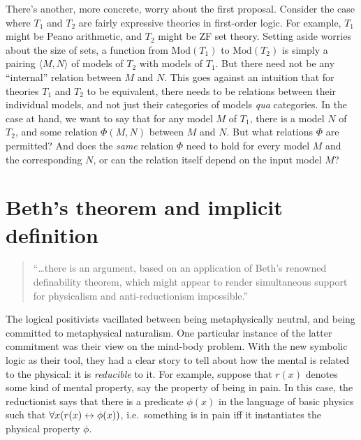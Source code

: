 \begin{example}
There's another, more concrete, worry about the first proposal.
Consider the case where $T_1$ and $T_2$ are fairly expressive theories
in first-order logic.  For example, $T_1$ might be Peano arithmetic,
and $T_2$ might be ZF set theory.  Setting aside worries about the
size of sets, a function from $\mathrm{Mod}(T_1)$ to
$\mathrm{Mod}(T_2)$ is simply a pairing $\langle M,N\rangle$ of models
of $T_2$ with models of $T_1$.  But there need not be any ``internal''
relation between $M$ and $N$.  This goes against an intuition that for
theories $T_1$ and $T_2$ to be equivalent, there needs to be relations
between their individual models, and not just their categories of
models {\it qua} categories.  In the case at hand, we want to say that
for any model $M$ of $T_1$, there is a model $N$ of $T_2$, and some
relation $\Phi (M,N)$ between $M$ and $N$.  But what relations $\Phi$
are permitted?  And does the {\it same} relation $\Phi$ need to hold
for every model $M$ and the corresponding $N$, or can the relation
itself depend on the input model $M$?

\end{example}




\section{Beth's theorem and implicit definition} \label{go-beth}

\begin{quote} ``\dots there is an argument, based on an application of
  Beth's renowned definability theorem, which might appear to render
  simultaneous support for physicalism and anti-reductionism
  impossible.''  \citep{hellman} \end{quote}

\bigskip \noindent The logical positivists vacillated between being
metaphysically neutral, and being committed to metaphysical
naturalism.  One particular instance of the latter commitment was
their view on the mind-body problem.  With the new symbolic logic as
their tool, they had a clear story to tell about how the mental is
related to the physical: it is \emph{reducible} to it.  For example,
suppose that $r(x)$ denotes some kind of mental property, say the
property of being in pain.  In this case, the reductionist says that
there is a predicate $\phi (x)$ in the language of basic physics such
that $\forall x(r(x)\leftrightarrow \phi (x))$, i.e.\ something is in pain iff it
instantiates the physical property $\phi$.

